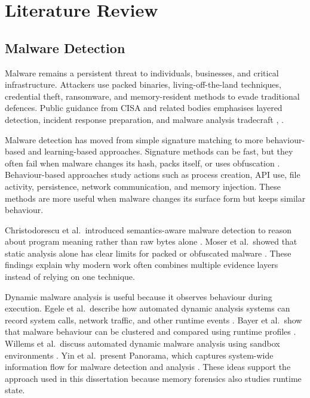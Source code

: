 \chapter{Literature Review}

\section{Malware Detection}

Malware remains a persistent threat to individuals, businesses, and critical infrastructure. Attackers use packed binaries, living-off-the-land techniques, credential theft, ransomware, and memory-resident methods to evade traditional defences. Public guidance from CISA and related bodies emphasises layered detection, incident response preparation, and malware analysis tradecraft \cite{cisa2023stopransomware}, \cite{cisa2026advisories}.

Malware detection has moved from simple signature matching to more behaviour-based and learning-based approaches. Signature methods can be fast, but they often fail when malware changes its hash, packs itself, or uses obfuscation \cite{santos2009ngrams}. Behaviour-based approaches study actions such as process creation, API use, file activity, persistence, network communication, and memory injection. These methods are more useful when malware changes its surface form but keeps similar behaviour.

Christodorescu et al.\ introduced semantics-aware malware detection to reason about program meaning rather than raw bytes alone \cite{christodorescu2005semantics}. Moser et al.\ showed that static analysis alone has clear limits for packed or obfuscated malware \cite{moser2007limits}. These findings explain why modern work often combines multiple evidence layers instead of relying on one technique.

Dynamic malware analysis is useful because it observes behaviour during execution. Egele et al.\ describe how automated dynamic analysis systems can record system calls, network traffic, and other runtime events \cite{egele2012survey}. Bayer et al.\ show that malware behaviour can be clustered and compared using runtime profiles \cite{bayer2009scalable}. Willems et al.\ discuss automated dynamic malware analysis using sandbox environments \cite{willems2007cwsandbox}. Yin et al.\ present Panorama, which captures system-wide information flow for malware detection and analysis \cite{yin2007panorama}. These ideas support the approach used in this dissertation because memory forensics also studies runtime state.

